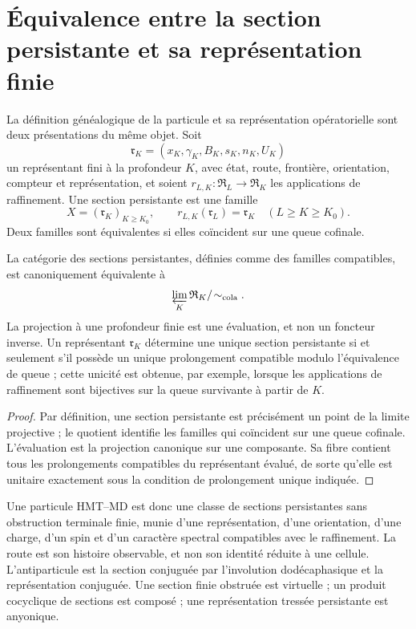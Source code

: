 \section{Équivalence entre la section persistante et sa représentation finie}

La définition généalogique de la particule et sa représentation opératorielle sont
deux présentations du même objet. Soit
\[
 \mathfrak r_K=(x_K,\gamma_K,B_K,s_K,n_K,U_K)
\]
un représentant fini à la profondeur \(K\), avec état, route, frontière,
orientation, compteur et représentation, et soient
\(r_{L,K}:\mathfrak R_L\to\mathfrak R_K\) les applications de raffinement. Une
section persistante est une famille
\[
 X=(\mathfrak r_K)_{K\ge K_0},
 \qquad r_{L,K}(\mathfrak r_L)=\mathfrak r_K
 \quad(L\ge K\ge K_0).
\]
Deux familles sont équivalentes si elles coïncident sur une queue cofinale.

\begin{theorem}
La catégorie des sections persistantes, définies comme des familles compatibles,
est canoniquement équivalente à
\[
 \varprojlim_K\mathfrak R_K/\!\sim_{\rm cola}.
\]
La projection à une profondeur finie est une évaluation, et non un foncteur inverse.
Un représentant \(\mathfrak r_K\) détermine une unique section persistante si
et seulement s'il possède un unique prolongement compatible modulo l'équivalence de queue ;
cette unicité est obtenue, par exemple, lorsque les applications de raffinement sont
bijectives sur la queue survivante à partir de \(K\).
\end{theorem}

\begin{proof}
Par définition, une section persistante est précisément un point de la limite
projective ; le quotient identifie les familles qui coïncident sur une queue cofinale.
L'évaluation est la projection canonique sur une composante. Sa fibre contient
tous les prolongements compatibles du représentant évalué, de sorte qu'elle
est unitaire exactement sous la condition de prolongement unique indiquée.
\end{proof}

Une particule HMT--MD est donc une classe de sections persistantes sans
obstruction terminale finie, munie d'une représentation, d'une orientation, d'une charge,
d'un spin et d'un caractère spectral compatibles avec le raffinement. La route est son
histoire observable, et non son identité réduite à une cellule. L'antiparticule
est la section conjuguée par l'involution dodécaphasique et la représentation
conjuguée. Une section finie obstruée est virtuelle ; un produit cocyclique de
sections est composé ; une représentation tressée persistante est anyonique.

